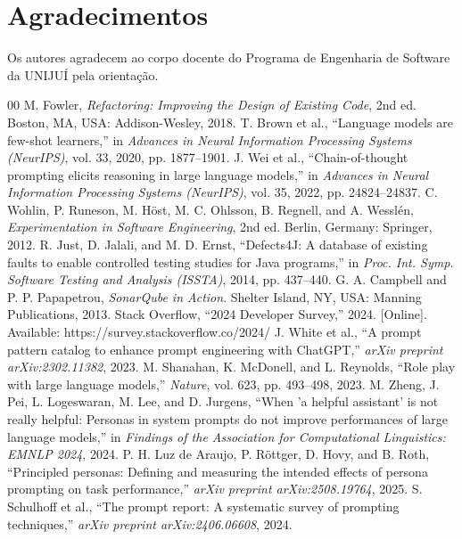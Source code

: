 \documentclass[10pt,conference,a4paper,twocolumn]{article}
\begin{document}
\section*{Agradecimentos}
Os autores agradecem ao corpo docente do Programa de Engenharia de Software da UNIJUÍ pela orientação.

\begin{thebibliography}{00}
 M. Fowler, \textit{Refactoring: Improving the Design of Existing Code}, 2nd ed. Boston, MA, USA: Addison-Wesley, 2018.
 T. Brown et al., ``Language models are few-shot learners,'' in \textit{Advances in Neural Information Processing Systems (NeurIPS)}, vol. 33, 2020, pp. 1877--1901.
 J. Wei et al., ``Chain-of-thought prompting elicits reasoning in large language models,'' in \textit{Advances in Neural Information Processing Systems (NeurIPS)}, vol. 35, 2022, pp. 24824--24837.
 C. Wohlin, P. Runeson, M. Höst, M. C. Ohlsson, B. Regnell, and A. Wesslén, \textit{Experimentation in Software Engineering}, 2nd ed. Berlin, Germany: Springer, 2012.
 R. Just, D. Jalali, and M. D. Ernst, ``Defects4J: A database of existing faults to enable controlled testing studies for Java programs,'' in \textit{Proc. Int. Symp. Software Testing and Analysis (ISSTA)}, 2014, pp. 437--440.
 G. A. Campbell and P. P. Papapetrou, \textit{SonarQube in Action}. Shelter Island, NY, USA: Manning Publications, 2013.
 Stack Overflow, ``2024 Developer Survey,'' 2024. [Online]. Available: https://survey.stackoverflow.co/2024/
 J. White et al., ``A prompt pattern catalog to enhance prompt engineering with ChatGPT,'' \textit{arXiv preprint arXiv:2302.11382}, 2023.
 M. Shanahan, K. McDonell, and L. Reynolds, ``Role play with large language models,'' \textit{Nature}, vol. 623, pp. 493--498, 2023.
 M. Zheng, J. Pei, L. Logeswaran, M. Lee, and D. Jurgens, ``When 'a helpful assistant' is not really helpful: Personas in system prompts do not improve performances of large language models,'' in \textit{Findings of the Association for Computational Linguistics: EMNLP 2024}, 2024.
 P. H. Luz de Araujo, P. Röttger, D. Hovy, and B. Roth, ``Principled personas: Defining and measuring the intended effects of persona prompting on task performance,'' \textit{arXiv preprint arXiv:2508.19764}, 2025.
 S. Schulhoff et al., ``The prompt report: A systematic survey of prompting techniques,'' \textit{arXiv preprint arXiv:2406.06608}, 2024.

\end{thebibliography}
\end{document}
